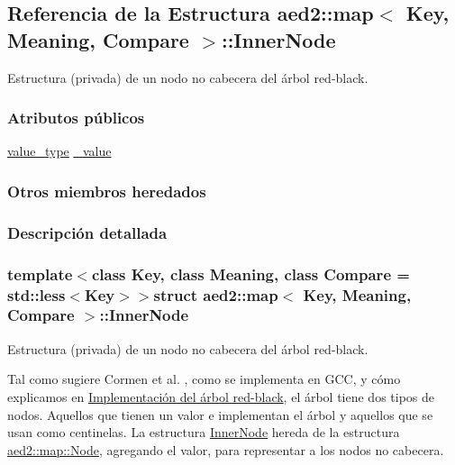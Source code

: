 \hypertarget{structaed2_1_1map_1_1InnerNode}{\subsection{Referencia de la Estructura aed2\-:\-:map$<$ Key, Meaning, Compare $>$\-:\-:Inner\-Node}
\label{structaed2_1_1map_1_1InnerNode}
}


Estructura (privada) de un nodo no cabecera del árbol red-\/black.  


\subsubsection*{Atributos públicos}
\begin{DoxyCompactItemize}
\item 
\hyperlink{classaed2_1_1map_a719db98e0ff9a837610f76be33264680_a719db98e0ff9a837610f76be33264680}{value\-\_\-type} \hyperlink{structaed2_1_1map_1_1InnerNode_a53fd8a50986fec67601dd77c44c1657e_a53fd8a50986fec67601dd77c44c1657e}{\-\_\-value}
\end{DoxyCompactItemize}
\subsubsection*{Otros miembros heredados}


\subsubsection{Descripción detallada}
\subsubsection*{template$<$class Key, class Meaning, class Compare = std\-::less$<$\-Key$>$$>$struct aed2\-::map$<$ Key, Meaning, Compare $>$\-::\-Inner\-Node}

Estructura (privada) de un nodo no cabecera del árbol red-\/black. 

Tal como sugiere Cormen et al. \cite{CormenLeisersonRivestStein2009}, como se implementa en G\-C\-C, y cómo explicamos en \hyperlink{Implementacion}{Implementación del árbol red-\/black}, el árbol tiene dos tipos de nodos. Aquellos que tienen un valor e implementan el árbol y aquellos que se usan como centinelas. La estructura \hyperlink{structaed2_1_1map_1_1InnerNode}{Inner\-Node} hereda de la estructura \hyperlink{structaed2_1_1map_1_1Node}{aed2\-::map\-::\-Node}, agregando el valor, para representar a los nodos no cabecera.

